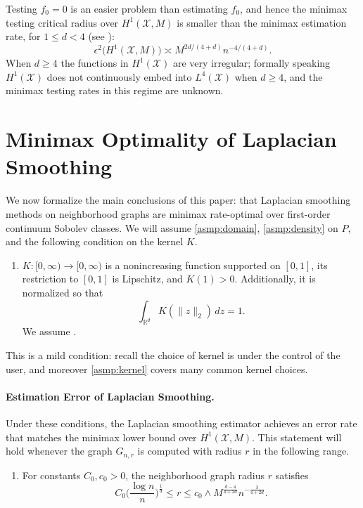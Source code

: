 \documentclass[twoside]{article}
\newcommand{\Reals}{\mathbb{R}}
\newcommand{\1}{\mathbf{1}}
\newcommand{\Rd}{\Reals^d}
\newcommand{\Xset}{\mathcal{X}}
\newcommand{\Leb}{L}
\newcommand{\wh}[1]{\widehat{#1}}
\theoremstyle{definition}
\theoremstyle{remark}
\begin{document}
Testing $f_0 = 0$ is an easier problem than estimating $f_0$, and hence the minimax testing critical radius over $H^1(\Xset,M)$ is smaller than the minimax estimation rate, for $1 \leq d < 4$ (see \citet{ingster2009}):
\begin{equation}
\label{eqn:sobolev_space_testing_critical_radius}
\epsilon^2\bigl(H^1(\Xset,M)\bigr) \asymp M^{2d/(4 + d)}n^{-4/(4 + d)}.
\end{equation}
When $d \geq 4$ the functions in $H^1(\Xset)$ are very irregular; formally speaking $H^1(\Xset)$ does not continuously embed into $\Leb^4(\Xset)$ when $d \geq 4$, and the minimax testing rates in this regime are unknown. 

\section{Minimax Optimality of Laplacian Smoothing}
\label{sec:minimax_optimal_laplacian_smoothing}

We now formalize the main conclusions of this paper: that Laplacian smoothing methods on neighborhood graphs are minimax rate-optimal over first-order continuum Sobolev classes. We will assume \ref{asmp:domain}, \ref{asmp:density} on $P$, and the following condition on the kernel $K$.
\begin{enumerate}[label=(K\arabic*)]
	\item
	\label{asmp:kernel}
	$K:[0,\infty) \to [0,\infty)$ is a nonincreasing function supported on $[0,1]$, its restriction to $[0,1]$ is Lipschitz, and $K(1) > 0$. Additionally, it is normalized so that
	\begin{equation*}
	\int_{\Rd} K(\|z\|_2) \,dz = 1.
	\end{equation*}
	We assume \smash{$\sigma_K = \frac{1}{d} \int_{\Rd} \|x\|_2^2 K(\|x\|_2) \,dx < \infty$}.
\end{enumerate}
This is a mild condition: recall the choice of kernel is under the control of the user, and moreover \ref{asmp:kernel} covers many common kernel choices.

\paragraph{Estimation Error of Laplacian Smoothing.} 

Under these conditions, the Laplacian smoothing estimator \smash{$\wh{f}$} achieves an error rate that matches the minimax lower bound over $H^1(\Xset,M)$. This statement will hold whenever the graph $G_{n,r}$ is computed with radius $r$ in the following range.
\begin{enumerate}[label=(R\arabic*)]
	\setcounter{enumi}{0}
	\item 
	\label{asmp:ls_kernel_radius_estimation}
	For constants $C_0,c_0>0$, the neighborhood graph radius $r$ satisfies
	\begin{equation*}
	C_0 \biggl(\frac{\log n}{n}\biggr)^{\frac{1}{d}} \leq r \leq c_0 \wedge M^{\frac{d - 4}{4 + 2d}} n^{-\frac{3}{4 + 2d}}.  
	\end{equation*}
\end{enumerate}
\end{document}
